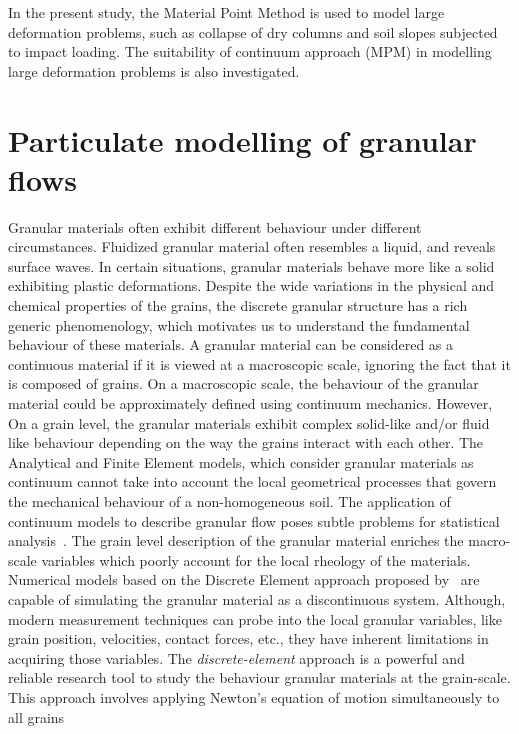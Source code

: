 In the present study, the Material Point Method is used to model large 
deformation problems, such as collapse of dry columns and soil slopes subjected 
to impact loading. The suitability of continuum approach (MPM) in modelling 
large deformation problems is also investigated.

\section{Particulate modelling of granular flows}

Granular materials often exhibit different behaviour under different 
circumstances. Fluidized granular material often resembles a liquid, and 
reveals surface waves. In certain situations, granular materials behave more 
like a solid exhibiting plastic deformations. Despite the wide variations in 
the physical and chemical properties of the grains, the discrete granular 
structure has a rich generic phenomenology, which motivates us to understand 
the fundamental behaviour of these materials. A granular material can be 
considered as a continuous material if it is viewed at a macroscopic scale, 
ignoring the fact that it is composed of grains. On a macroscopic scale, the 
behaviour of the granular material could be approximately defined using 
continuum mechanics. However, On a grain level, the granular materials 
exhibit complex solid-like and/or fluid like behaviour depending on the way the 
grains interact with each other. The Analytical and Finite Element models, 
which consider granular materials as continuum cannot take into account the 
local geometrical processes that govern the mechanical behaviour of a 
non-homogeneous soil. The application of continuum models to describe granular 
flow poses subtle problems for statistical analysis~\citep{mehta1994}. The 
grain level description of the granular material enriches the macro-scale 
variables which poorly account for the local rheology of the materials. 
Numerical models based on the Discrete Element approach proposed 
by~\citet{Cundall1979} are capable of simulating the granular material as a 
discontinuous system. Although, modern measurement techniques can probe into 
the local granular variables, like grain position, velocities, contact 
forces, etc., they have inherent limitations in acquiring those variables. The 
\textit{discrete-element} approach is a powerful and reliable research tool to 
study the behaviour granular materials at the grain-scale. This approach 
involves applying Newton's equation of motion simultaneously to all grains 
